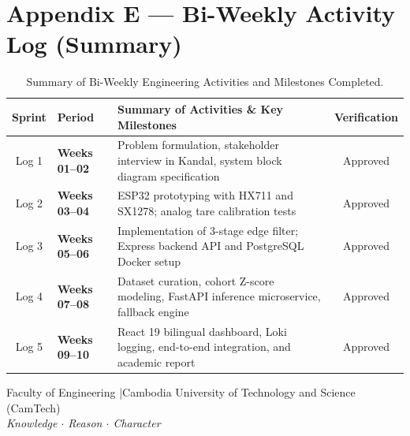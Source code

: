 \documentclass[11pt,a4paper]{report}
\begin{document}
\section*{Appendix E --- Bi-Weekly Activity Log (Summary)}
\begin{table}[htbp]
    \centering
    \caption{Summary of Bi-Weekly Engineering Activities and Milestones Completed.}
    \label{tab:biweekly_log}
    \vspace{0.2cm}
    \small
    \begin{tabularx}{\textwidth}{|c|>{\bfseries}p{3.2cm}|X|c|}
        \hline
        \rowcolor{tableShade}
        Sprint & Period & Summary of Activities \& Key Milestones & Verification \\ \hline
        Log 1 & Weeks 01--02 & Problem formulation, stakeholder interview in Kandal, system block diagram specification & Approved \\ \hline
        Log 2 & Weeks 03--04 & ESP32 prototyping with HX711 and SX1278; analog tare calibration tests & Approved \\ \hline
        Log 3 & Weeks 05--06 & Implementation of 3-stage edge filter; Express backend API and PostgreSQL Docker setup & Approved \\ \hline
        Log 4 & Weeks 07--08 & Dataset curation, cohort Z-score modeling, FastAPI inference microservice, fallback engine & Approved \\ \hline
        Log 5 & Weeks 09--10 & React 19 bilingual dashboard, Loki logging, end-to-end integration, and academic report & Approved \\ \hline
    \end{tabularx}
\end{table}

\vspace{1cm}
\begin{center}
    \small\color{camtechNavy}
    Faculty of Engineering \quad|\quad Cambodia University of Technology and Science (CamTech)\\
    \textit{Knowledge $\cdot$ Reason $\cdot$ Character}
\end{center}
\end{document}
